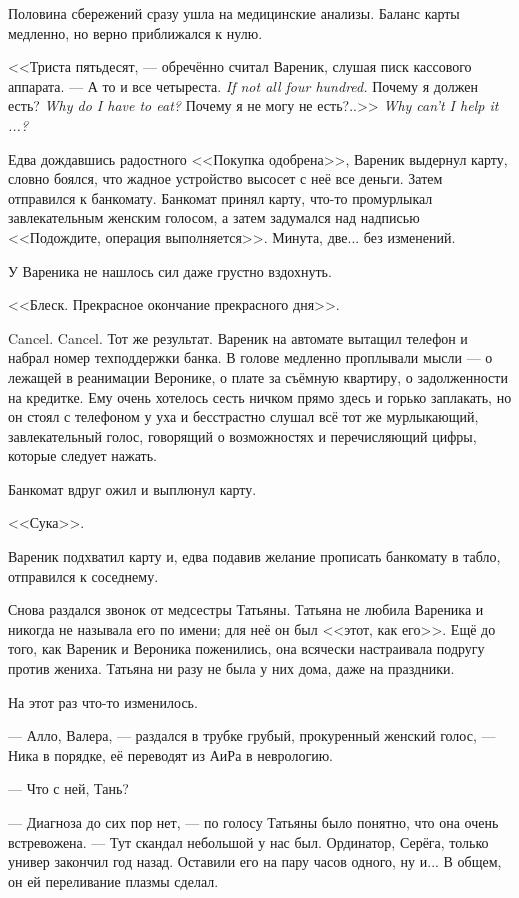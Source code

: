 Половина сбережений сразу ушла на медицинские анализы.
Баланс карты медленно, но верно приближался к нулю.

<<Триста пятьдесят, --- обречённо считал Вареник, слушая писк кассового аппарата.
{--- А то и все четыреста.}
{\textit{If not all four hundred.}}
{Почему я должен есть?}
{\textit{Why do I have to eat?}}
{Почему я не могу не есть?..>>}
{\textit{Why can't I help it ...?}}

Едва дождавшись радостного <<Покупка одобрена>>, Вареник выдернул карту, словно боялся, что жадное устройство высосет с неё все деньги.
Затем отправился к банкомату.
Банкомат принял карту, что-то промурлыкал завлекательным женским голосом, а затем задумался над надписью <<Подождите, операция выполняется>>.
Минута, две... без изменений.

У Вареника не нашлось сил даже грустно вздохнуть.

<<Блеск.
Прекрасное окончание прекрасного дня>>.

Cancel.
Cancel.
Тот же результат.
Вареник на автомате вытащил телефон и набрал номер техподдержки банка.
В голове медленно проплывали мысли --- о лежащей в реанимации Веронике, о плате за съёмную квартиру, о задолженности на кредитке.
Ему очень хотелось сесть ничком прямо здесь и горько заплакать, но он стоял с телефоном у уха и бесстрастно слушал всё тот же мурлыкающий, завлекательный голос, говорящий о возможностях и перечисляющий цифры, которые следует нажать.

Банкомат вдруг ожил и выплюнул карту.

<<Сука>>.

Вареник подхватил карту и, едва подавив желание прописать банкомату в табло, отправился к соседнему.

\asterism

\textspace

Снова раздался звонок от медсестры Татьяны.
Татьяна не любила Вареника и никогда не называла его по имени;
для неё он был <<этот, как его>>.
Ещё до того, как Вареник и Вероника поженились, она всячески настраивала подругу против жениха.
Татьяна ни разу не была у них дома, даже на праздники.

На этот раз что-то изменилось.

--- Алло, Валера, --- раздался в трубке грубый, прокуренный женский голос, --- Ника в порядке, её переводят из АиРа в неврологию.

--- Что с ней, Тань?

--- Диагноза до сих пор нет, --- по голосу Татьяны было понятно, что она очень встревожена.
--- Тут скандал небольшой у нас был.
Ординатор, Серёга, только универ закончил год назад.
Оставили его на пару часов одного, ну и...
В общем, он ей переливание плазмы сделал.

